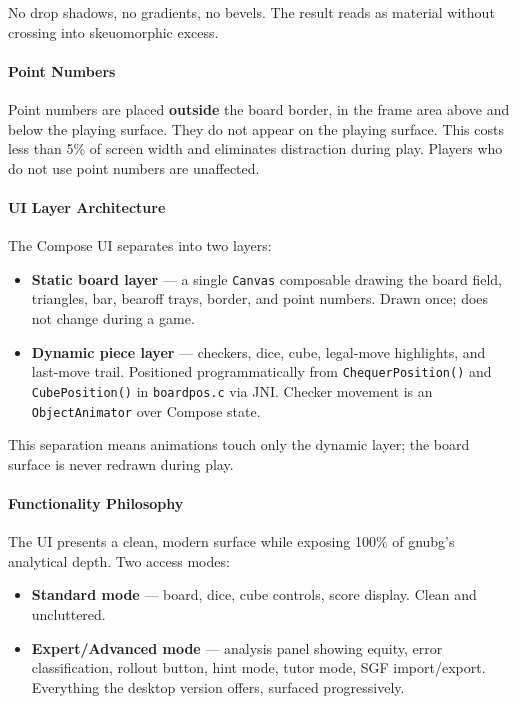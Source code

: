 \documentclass[11pt,a4paper]{article}
\providecommand{\tightlist}{\setlength{\itemsep}{2pt}\setlength{\parskip}{0pt}}
\begin{document}
No drop shadows, no gradients, no bevels. The result reads as material
without crossing into skeuomorphic excess.

\paragraph{Point Numbers}\label{point-numbers}

Point numbers are placed \textbf{outside} the board border, in the
frame area above and below the playing surface. They do not appear on
the playing surface. This costs less than 5\% of screen width and
eliminates distraction during play. Players who do not use point numbers
are unaffected.

\paragraph{UI Layer Architecture}\label{ui-layer-architecture}

The Compose UI separates into two layers:

\begin{itemize}
\tightlist
\item
  \textbf{Static board layer} --- a single \texttt{Canvas} composable
  drawing the board field, triangles, bar, bearoff trays, border, and
  point numbers. Drawn once; does not change during a game.
\item
  \textbf{Dynamic piece layer} --- checkers, dice, cube, legal-move
  highlights, and last-move trail. Positioned programmatically from
  \texttt{ChequerPosition()} and \texttt{CubePosition()} in
  \texttt{boardpos.c} via JNI. Checker movement is an
  \texttt{ObjectAnimator} over Compose state.
\end{itemize}

This separation means animations touch only the dynamic layer; the board
surface is never redrawn during play.

\paragraph{Functionality Philosophy}\label{functionality-philosophy}

The UI presents a clean, modern surface while exposing 100\% of gnubg's
analytical depth. Two access modes:

\begin{itemize}
\tightlist
\item
  \textbf{Standard mode} --- board, dice, cube controls, score display.
  Clean and uncluttered.
\item
  \textbf{Expert/Advanced mode} --- analysis panel showing equity, error
  classification, rollout button, hint mode, tutor mode, SGF
  import/export. Everything the desktop version offers, surfaced
  progressively.
\end{itemize}
\end{document}
